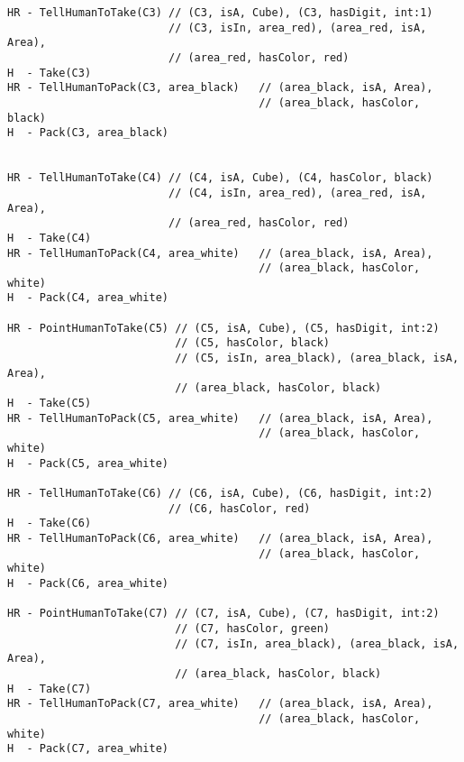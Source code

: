 \begin{lstlisting}[frame=single, basicstyle=\scriptsize\ttfamily, label={lst:chap5_case3}, caption={The \acrshort{hatp} solution for the third case study of the chapter \ref{chap:5}. The robot chooses to point instead of verbalizing to designate the cubes 5 and 7. Please note the order of cube motions is not considered in this problem. The lines beginning with H represent the actions of the human and the lines beginning with HR represent actions involving the human and the robot (communication actions). In green are the \acrshort{reg} results for each communication action even if a pointing has been choose.}, captionpos=t, style=HatpPlan]
HR - TellHumanToTake(C3) // (C3, isA, Cube), (C3, hasDigit, int:1)
                         // (C3, isIn, area_red), (area_red, isA, Area),
                         // (area_red, hasColor, red)
H  - Take(C3)
HR - TellHumanToPack(C3, area_black)   // (area_black, isA, Area),
                                       // (area_black, hasColor, black)
H  - Pack(C3, area_black)


HR - TellHumanToTake(C4) // (C4, isA, Cube), (C4, hasColor, black)
                         // (C4, isIn, area_red), (area_red, isA, Area),
                         // (area_red, hasColor, red)
H  - Take(C4)
HR - TellHumanToPack(C4, area_white)   // (area_black, isA, Area),
                                       // (area_black, hasColor, white)
H  - Pack(C4, area_white)

HR - PointHumanToTake(C5) // (C5, isA, Cube), (C5, hasDigit, int:2)
                          // (C5, hasColor, black)
                          // (C5, isIn, area_black), (area_black, isA, Area),
                          // (area_black, hasColor, black)
H  - Take(C5)
HR - TellHumanToPack(C5, area_white)   // (area_black, isA, Area),
                                       // (area_black, hasColor, white)
H  - Pack(C5, area_white)

HR - TellHumanToTake(C6) // (C6, isA, Cube), (C6, hasDigit, int:2)
                         // (C6, hasColor, red)
H  - Take(C6)
HR - TellHumanToPack(C6, area_white)   // (area_black, isA, Area),
                                       // (area_black, hasColor, white)
H  - Pack(C6, area_white)

HR - PointHumanToTake(C7) // (C7, isA, Cube), (C7, hasDigit, int:2)
                          // (C7, hasColor, green)
                          // (C7, isIn, area_black), (area_black, isA, Area),
                          // (area_black, hasColor, black)
H  - Take(C7)
HR - TellHumanToPack(C7, area_white)   // (area_black, isA, Area),
                                       // (area_black, hasColor, white)
H  - Pack(C7, area_white)


\end{lstlisting}

